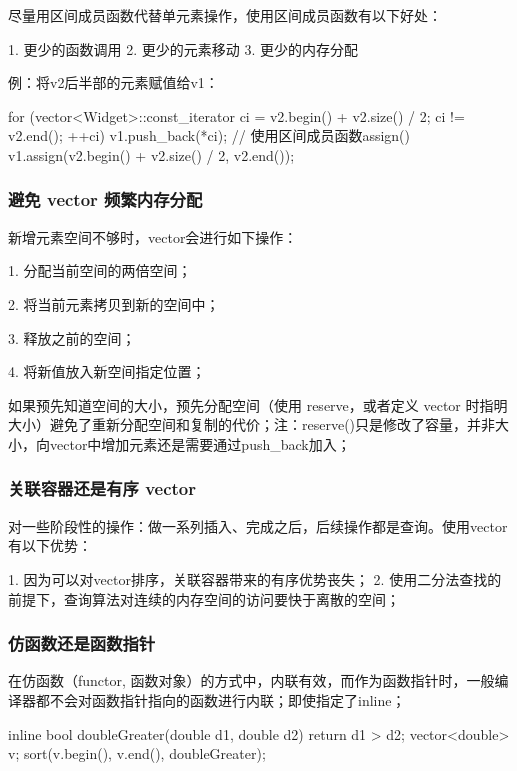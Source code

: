 尽量用区间成员函数代替单元素操作，使用区间成员函数有以下好处：

1. 更少的函数调用
2. 更少的元素移动
3. 更少的内存分配

例：将v2后半部的元素赋值给v1：

\begin{Code}
for (vector<Widget>::const_iterator ci = v2.begin() + v2.size() / 2;
ci != v2.end();
++ci)
v1.push_back(*ci);
// 使用区间成员函数assign()
v1.assign(v2.begin() + v2.size() / 2, v2.end());
\end{Code}

\subsubsection {避免 vector 频繁内存分配}

新增元素空间不够时，vector会进行如下操作：

1. 分配当前空间的两倍空间；

2. 将当前元素拷贝到新的空间中；

3. 释放之前的空间；

4. 将新值放入新空间指定位置；

如果预先知道空间的大小，预先分配空间（使用 reserve，或者定义 vector 时指明大小）避免了重新分配空间和复制的代价；注：reserve()只是修改了容量，并非大小，向vector中增加元素还是需要通过push_back加入；

\subsubsection {关联容器还是有序 vector}

对一些阶段性的操作：做一系列插入、完成之后，后续操作都是查询。使用vector有以下优势：

1. 因为可以对vector排序，关联容器带来的有序优势丧失；
2. 使用二分法查找的前提下，查询算法对连续的内存空间的访问要快于离散的空间；

\subsubsection {仿函数还是函数指针}

在仿函数（functor, 函数对象）的方式中，内联有效，而作为函数指针时，一般编译器都不会对函数指针指向的函数进行内联；即使指定了inline；

\begin{Code}
inline bool doubleGreater(double d1, double d2)
{
	return d1 > d2;
}
vector<double> v;
sort(v.begin(), v.end(), doubleGreater);
\end{Code}

